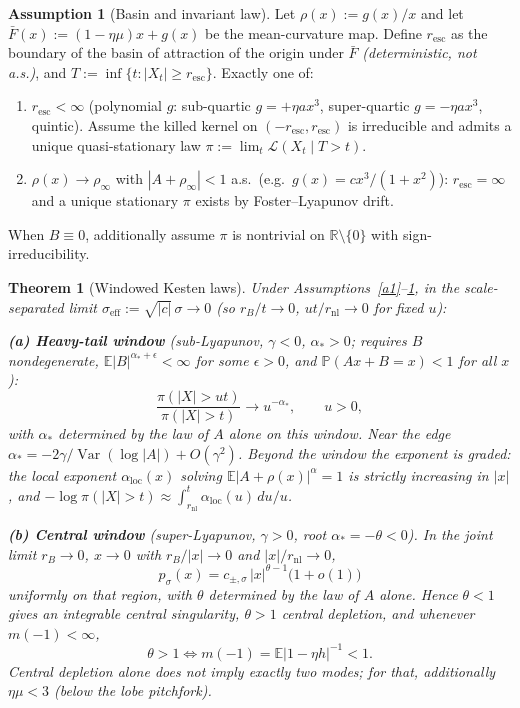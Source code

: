 \documentclass{article} %
\theoremstyle{plain}
\newtheorem{theorem}{Theorem}
\theoremstyle{definition}
\newtheorem{assumption}{Assumption}
\begin{document}
\begin{itemize}[nosep,leftmargin=*]
\begin{assumption}[Basin and invariant law]\label{a3}
Let $\rho(x):=g(x)/x$ and let $\bar F(x):=(1-\eta\mu)x+g(x)$ be the
mean-curvature map. Define $r_{\mathrm{esc}}$ as the boundary of the basin
of attraction of the origin under $\bar F$ \emph{(deterministic, not a.s.)},
and $T:=\inf\{t:|X_t|\ge r_{\mathrm{esc}}\}$. Exactly one of:
\begin{enumerate}
\item[\textup{(P)}] $r_{\mathrm{esc}}<\infty$ (polynomial $g$: sub-quartic
$g=+\eta a x^3$, super-quartic $g=-\eta a x^3$, quintic). Assume the killed
kernel on $(-r_{\mathrm{esc}},r_{\mathrm{esc}})$ is irreducible and admits a
unique quasi-stationary law $\pi:=\lim_t\mathcal L(X_t\mid T>t)$.
\item[\textup{(S)}] $\rho(x)\to\rho_\infty$ with $|A+\rho_\infty|<1$ a.s.\
(e.g.\ $g(x)=cx^3/(1+x^2)$): $r_{\mathrm{esc}}=\infty$ and a unique
stationary $\pi$ exists by Foster--Lyapunov drift.
\end{enumerate}
When $B\equiv0$, additionally assume $\pi$ is nontrivial on
$\mathbb R\setminus\{0\}$ with sign-irreducibility.
\end{assumption}

\begin{theorem}[Windowed Kesten laws]\label{thm2}
Under Assumptions~\ref{a1}--\ref{a3}, in the scale-separated limit
$\sigma_{\mathrm{eff}}:=\sqrt{|c|}\,\sigma\to0$ (so $r_B/t\to0$,
$ut/r_{\mathrm{nl}}\to0$ for fixed $u$):

\smallskip\noindent\textbf{(a) Heavy-tail window} (sub-Lyapunov, $\gamma<0$,
$\alpha_*>0$; requires $B$ nondegenerate, $\mathbb E|B|^{\alpha_*+\epsilon}<\infty$
for some $\epsilon>0$, and $\mathbb P(Ax+B=x)<1$ for all $x$):
\[
\frac{\pi(|X|>ut)}{\pi(|X|>t)}\longrightarrow u^{-\alpha_*},\qquad u>0 ,
\]
with $\alpha_*$ determined by the law of $A$ alone \emph{on this window}.
Near the edge $\alpha_*=-2\gamma/\operatorname{Var}(\log|A|)+O(\gamma^2)$.
Beyond the window the exponent is graded: the local exponent
$\alpha_{\mathrm{loc}}(x)$ solving $\mathbb E|A+\rho(x)|^{\alpha}=1$ is
strictly increasing in $|x|$, and
$-\log\pi(|X|>t)\approx\int_{r_{\mathrm{nl}}}^{t}\alpha_{\mathrm{loc}}(u)\,du/u$.

\smallskip\noindent\textbf{(b) Central window} (super-Lyapunov, $\gamma>0$,
root $\alpha_*=-\theta<0$). In the joint limit $r_B\to0$, $x\to0$ with
$r_B/|x|\to0$ and $|x|/r_{\mathrm{nl}}\to0$,
\[
p_\sigma(x)=c_{\pm,\sigma}\,|x|^{\theta-1}\bigl(1+o(1)\bigr)
\]
uniformly on that region, with $\theta$ determined by the law of $A$ alone.
Hence $\theta<1$ gives an integrable central singularity, $\theta>1$ central
depletion, and whenever $m(-1)<\infty$,
\[
\boxed{\ \theta>1\iff m(-1)=\mathbb E|1-\eta h|^{-1}<1.\ }
\]
Central depletion alone does not imply exactly two modes; for that,
additionally $\eta\mu<3$ (below the lobe pitchfork).


\end{theorem}
\end{itemize}
\end{document}
